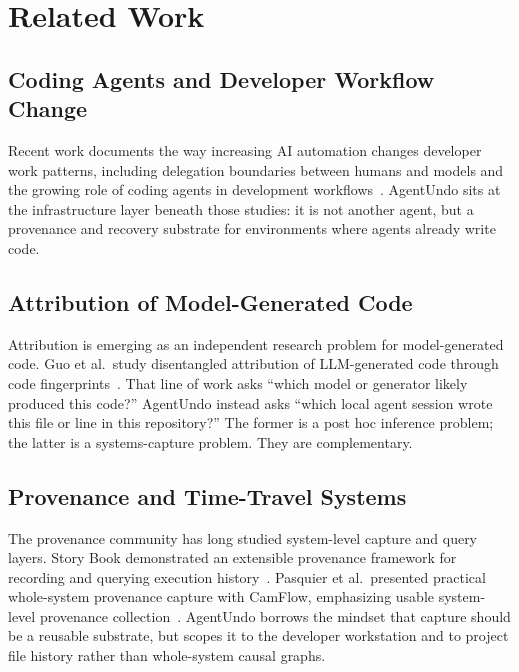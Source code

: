 \documentclass[10pt,a4paper]{article}
\begin{document}
\section{Related Work}

\subsection{Coding Agents and Developer Workflow Change}

Recent work documents the way increasing AI automation changes developer work
patterns, including delegation boundaries between humans and models and the
growing role of coding agents in development
workflows~\cite{chen2025codewithme,agarwal2026aiides}. AgentUndo sits at the
infrastructure layer beneath those studies: it is not another agent, but a
provenance and recovery substrate for environments where agents already write
code.

\subsection{Attribution of Model-Generated Code}

Attribution is emerging as an independent research problem for model-generated
code. Guo et al.\ study disentangled attribution of LLM-generated code through
code fingerprints~\cite{guo2026codefingerprints}. That line of work asks
``which model or generator likely produced this code?'' AgentUndo instead asks
``which local agent session wrote this file or line in this repository?'' The
former is a post hoc inference problem; the latter is a systems-capture
problem. They are complementary.

\subsection{Provenance and Time-Travel Systems}

The provenance community has long studied system-level capture and query layers.
Story Book demonstrated an extensible provenance framework for recording and
querying execution history~\cite{spillane2009storybook}. Pasquier et al.\
presented practical whole-system provenance capture with CamFlow, emphasizing
usable system-level provenance collection~\cite{pasquier2017practicalprovenance}.
AgentUndo borrows the mindset that capture should be a reusable substrate, but
scopes it to the developer workstation and to project file history rather than
whole-system causal graphs.
\end{document}

